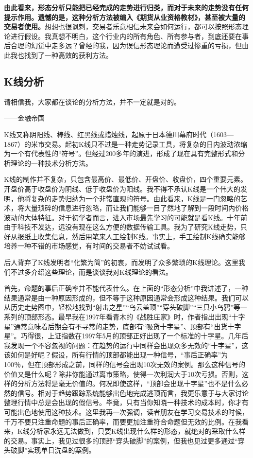 \textbf{由此看来，形态分析只能把已经完成的走势进行归类，而对于未来的走势没有任何提示作用。遗憾的是，这种分析方法被编入《期货从业资格教材》，甚至被大量的交易者使用。}想想也很讽刺，交易者乐意相信未来会如何运行，都可以按照形态理论进行假设。我真想不明白，这个行业内的所有角色、所有参与者，到底还要在事后合理的幻觉中走多远？曾经的我，因为误信形态理论而遭受过惨重的亏损，但由此我也找到了一种高效的获利方法。

\subsection{K线分析}

{\kaishu
请相信我，大家都在谈论的分析方法，并不一定就是对的。

\hfill ——金融帝国
}

K线又称阴阳线、棒线、红黑线或蜡烛线，起原于日本德川幕府时代（1603—1867）的米市交易。起初K线只不过是一种走势记录工具，将复杂的日内波动浓缩为一个有代表性的“符号”。但经过200多年的演进，形成了现在具有完整形式和分析理论的一种技术分析方法。

K线的制作并不复杂，只包含最高价、最低价、开盘价、收盘价，四个重要元素。开盘价高于收盘价为阴线、低于收盘价为阳线。我不得不承认K线是一个伟大的发明，他将复杂的走势归纳为一个非常直观的符号。由此看来，K线是一门忽略的艺术，将大量琐碎的信息进行忽略，而让我们能够一目了然地了解到一段时间内价格波动的大体特征。对于初学者而言，进入市场最先学习的可能就是看K线。十年前由于科技不发达，远没有现在这么方便的数据传输工具。我为了研究K线走势，只好从报纸上收集信息，然后用笔来人工绘制K线。事实上，手工绘制K线确实能够培养一种不错的市场感觉，有时间的交易者不妨试试看。

后人背弃了K线发明者“化繁为简”的初衷，而发明了众多繁琐的K线理论。这里我们不过多介绍这些理论，而是谈谈我对K线理论的看法。

首先，命题的事后正确率并不能代表什么。在上面的“形态分析”中我讲述了，一种结果通常是由一种原因形成的，但不等于这种原因通常会形成这种结果。我们可以从历史走势图中，轻松地找到“射击之星”“乌云盖顶”“穿头破脚”“三只小乌鸦”等一系列的顶部形态。最早我在1997年看青木的《战胜庄家》时，作者指出出现“十字星”通常意味着后期会有不寻常的走势，底部有“吸货十字星”、顶部有“出货十字星”。巧得很，上证指数在1997年5月的顶部正好出现了一个标准的十字星。几年后我发现一个不容忽视的问题：在趋势的运行中同样会出现众多无效的“十字星”，这该如何是好呢？假设，所有行情的顶部都能出现一种信号，“事后正确率”为100％，但在顶部形成之前，同样的信号会出现10次无效的案例。那么这种信号的价值又是什么呢？除非你能通过离市策略，使得一次利润大于10次亏损。否则，这样的分析方法将是毫无价值的。何况即使这样，“顶部会出现十字星”也不是什么必然的信号。相对于趋势跟踪系统能够出色地完成逃顶而言，我更乐意于与大家讨论整理行情中总是会出现的假信号。毕竟，只有当你知晓一种技术的成本时，你才有可能出色地使用这种技术。这里我再一次强调，读者朋友在学习交易技术的时候，千万不要只注重命题的事后正确率，而要更加注重符合命题但无效的比例。在我看来，K线分析家永远无法做到，只要K线出现什么样的形态，就绝对的采取什么样的交易。事实上，我见过很多的顶部“穿头破脚”的案例，但我也见过更多通过“穿头破脚”实现单日洗盘的案例。

